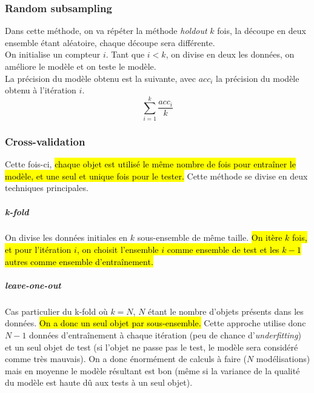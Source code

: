 \documentclass[letterpaper, 12pt]{article}
\newcommand{\alinea}{
\hspace*{0.5cm}}
\begin{document}
			\subsubsection{Random subsampling}
				\alinea Dans cette méthode, on va répéter la méthode
					\textit{holdout} $k$ fois, la découpe en deux ensemble
					étant aléatoire, chaque découpe sera différente.\\
				\alinea On initialise un compteur $i$. Tant que $i < k$,
					on divise en deux les données, on améliore le modèle et
					on teste le modèle.\\
				\alinea La précision du modèle obtenu est la suivante, 
					avec $acc_i$ la précision du modèle obtenu à 
					l'itération $i$.
					$$ \sum_{i=1}^{k} \frac{acc_i}{k} $$
			\subsubsection{Cross-validation}
				\alinea Cette fois-ci, \hl{chaque objet est utilisé le même
					nombre de fois pour entraîner le modèle, et une 
					seul et unique fois pour le tester.} Cette méthode
					se divise en deux techniques principales.
				\subparagraph{k-fold} On divise les données initiales en
					$k$ sous-ensemble de même taille. \hl{On itère $k$ fois,
					et pour l'itération $i$, on choisit l'ensemble $i$
					comme ensemble de test et les $k-1$ autres comme 
					ensemble d'entraînement.}
				\subparagraph{leave-one-out} Cas particulier du k-fold
					où $k = N$, $N$ étant le nombre d'objets présents dans
					les données. \hl{On a donc un seul objet par 
					sous-ensemble.}
					Cette approche utilise donc $N-1$ données d'entraînement
					à chaque itération (peu de chance d'\textit{underfitting})
					et un seul objet de test (si l'objet ne passe pas le test,
					le modèle sera considéré comme très mauvais). On a donc
					énormément de calculs à faire ($N$ modélisations) mais
					en moyenne le modèle résultant est bon (même si la 
					variance de la qualité du modèle est haute dû aux tests
					à un seul objet).
\end{document}
